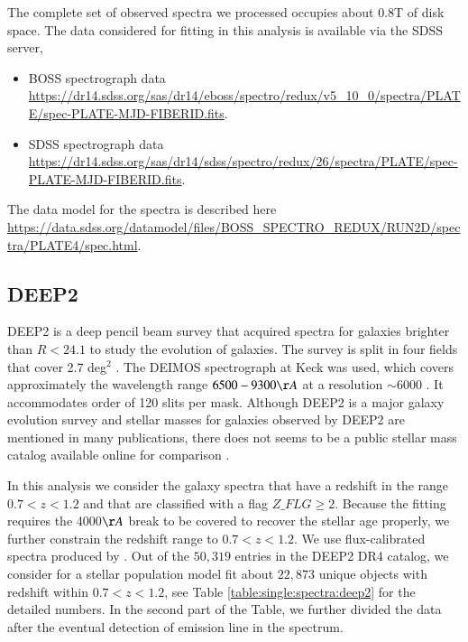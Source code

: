 \documentclass[onecolumn]{aa}
\begin{document}
The complete set of observed spectra we processed occupies about 0.8T of disk space.
The data considered for fitting in this analysis is available via the SDSS server,
\begin{itemize}
\item BOSS spectrograph data\\ \url{https://dr14.sdss.org/sas/dr14/eboss/spectro/redux/v5_10_0/spectra/PLATE/spec-PLATE-MJD-FIBERID.fits}. 
\item SDSS spectrograph data\\ \url{https://dr14.sdss.org/sas/dr14/sdss/spectro/redux/26/spectra/PLATE/spec-PLATE-MJD-FIBERID.fits}.
\end{itemize}
The data model for the spectra is described here \url{https://data.sdss.org/datamodel/files/BOSS_SPECTRO_REDUX/RUN2D/spectra/PLATE4/spec.html}. 

\subsection{DEEP2}
DEEP2 is a deep pencil beam survey that acquired spectra for galaxies brighter than $R<24.1$ to study the evolution of galaxies. The survey is split in four fields that cover 2.7 deg$^2$  \citep{Newman_2013}. 
The DEIMOS spectrograph at Keck was used, which covers approximately the wavelength range $6500-9300\AA$ at a resolution $\sim$6000 \citep{Faber2003}. It accommodates order of 120 slits per mask. 
Although DEEP2 is a major galaxy evolution survey and stellar masses for galaxies observed by DEEP2 are mentioned in many publications, there does not seems to be a public stellar mass catalog available online for comparison \citep{kassin2007,covington2010,mostek2013,2017ApJ...838...87C}. 

In this analysis we consider the galaxy spectra that have a redshift in the range $0.7<z<1.2$ and that are classified with a flag $Z\_FLG\geq2$. 
Because the fitting requires the 4000$\AA$ break to be covered to recover the stellar age properly, we further constrain the redshift range to $0.7<z<1.2$. 
We use flux-calibrated spectra produced by \citet{Comparat2016LFs}. 
Out of the $50,319$ entries in the DEEP2 DR4 catalog, we consider for a stellar population model fit about $22,873$ unique objects with redshift within $0.7<z<1.2$, see Table \ref{table:single:spectra:deep2} for the detailed numbers. 
In the second part of the Table, we further divided the data after the eventual detection of emission line in the spectrum. 
\end{document}
